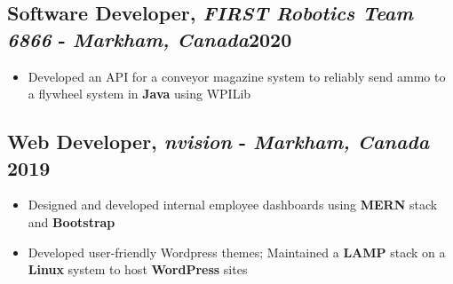 \documentclass[9pt]{article}
\begin{document}
\subsection{Software Developer, \textit{FIRST Robotics Team 6866} - \normalsize\textit{Markham, Canada}\hfill \normalsize\textnormal{2020}}
\begin{itemize}
  \item Developed an API for a conveyor magazine system to reliably send ammo to a flywheel system in \textbf{Java} using WPILib
\end{itemize}

\subsection{Web Developer, \textit{nvision} - \normalsize\textit{Markham, Canada} \hfill \normalsize\textnormal{2019}}
\begin{itemize}
  \item Designed and developed internal employee dashboards using \textbf{MERN} stack and \textbf{Bootstrap} 
  \item Developed user-friendly Wordpress themes; Maintained a \textbf{LAMP} stack on a \textbf{Linux} system to host \textbf{WordPress} sites
\end{itemize}


\end{document}
